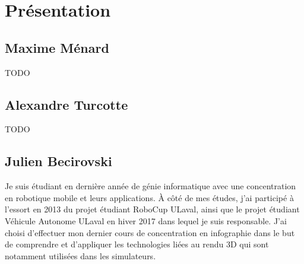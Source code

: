 \section{Présentation}
\label{s:présentation}

\subsection{Maxime Ménard}
TODO
\subsection{Alexandre Turcotte}
TODO
\subsection{Julien Becirovski}
Je suis étudiant en dernière année de génie informatique avec une concentration en robotique mobile et leurs applications. À côté de mes études, j'ai participé à l'essort en 2013 du projet étudiant RoboCup ULaval, ainsi que le projet étudiant Véhicule Autonome ULaval en hiver 2017 dans lequel je suis responsable. J'ai choisi d'effectuer mon dernier cours de concentration en infographie dans le but de comprendre et d'appliquer les technologies liées au rendu 3D qui sont notamment utilisées dans les simulateurs.
